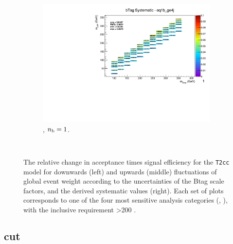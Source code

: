 \begin{figure}[ht!]
\begin{subfigure}[b]{0.32\textwidth}
    \includegraphics[width=\textwidth, page=1]{Figs/sms/t2cc/v37/systs/T2cc_bTag_eq1b_ge4j.pdf}
    \caption{\njhigh, $n_{\text{b}} = 1$.}
  \end{subfigure}\\
  \caption{The relative change in acceptance times signal efficiency for the
  \texttt{T2cc} model for downwards (left) and upwards (middle) fluctuations
  of global event weight according to the uncertainties of the Btag scale 
  factors,
  and the derived systematic values (right). Each set of plots corresponds
  to one of the four most sensitive analysis categories (\nb, \nj), with the
  inclusive requirement \HT>200 \gev.}
  \label{fig:sms-btag-t2cc}
\end{figure}


\newpage
\subsection*{\mhtmet cut}
\label{sec:t2cc_mhtmet_plots}

